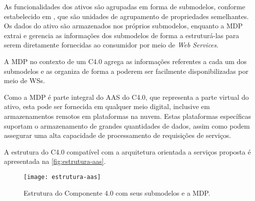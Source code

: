 


As funcionalidades dos ativos são agrupadas em forma de submodelos, conforme estabelecido em , que são unidades de agrupamento de propriedades semelhantes. Os dados do ativo são armazenados nos próprios submodelos, enquanto a MDP extrai e gerencia as informações dos submodelos de forma a estruturá-las para serem diretamente fornecidas ao consumidor por meio de \textit{Web Services}.

A MDP no contexto de um C4.0 agrega as informações referentes a cada um dos submodelos e as organiza de forma a poderem ser facilmente disponibilizadas por meio de WSs.

Como a MDP é parte integral do AAS do C4.0, que representa a parte virtual do ativo, esta pode ser fornecida em qualquer meio digital, inclusive em armazenamentos remotos em plataformas na nuvem. Estas plataformas específicas suportam o armazenamento de grandes quantidades de dados, assim como podem assegurar uma alta capacidade de processamento de requisições de serviços.

A estrutura do C4.0 compatível com a arquitetura orientada a serviços proposta é apresentada na \autoref{fig:estrutura-aas}.

\begin{figure}[htb]
	\centering
	\texttt{[image: estrutura-aas]}
	\caption{Estrutura do Componente 4.0 com seus submodelos e a MDP.}
	\label{fig:estrutura-aas}
\end{figure}

